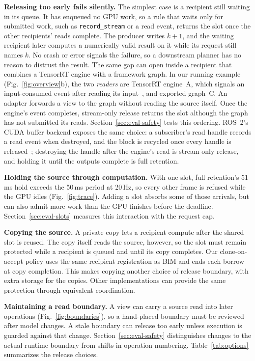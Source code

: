 \documentclass[conference]{IEEEtran}
\newcommand{\code}[1]{\texttt{#1}}
\newcommand{\ms}{\,ms}
\newcommand{\Hz}{\,Hz}
\begin{document}
\textbf{Releasing too early fails silently.} The simplest case is a recipient still waiting in its queue. It has enqueued no GPU work, so a rule that waits only for submitted work, such as \code{record\_stream} or a read event, returns the slot once the other recipients' reads complete. The producer writes $k{+}1$, and the waiting recipient later computes a numerically valid result on it while its request still names $k$. No crash or error signals the failure, so a downstream planner has no reason to distrust the result. The same gap can open inside a recipient that combines a TensorRT engine with a framework graph. In our running example (Fig.~\ref{fig:overview}b), the two \emph{readers} are TensorRT engine~A, which signals an input-consumed event after reading its input~\cite{tensorrt}, and exported graph~C. An adapter forwards a view to the graph without reading the source itself. Once the engine's event completes, stream-only release returns the slot although the graph has not submitted its reads. Section~\ref{sec:eval-safety} tests this ordering. ROS~2's CUDA buffer backend exposes the same choice: a subscriber's read handle records a read event when destroyed, and the block is recycled once every handle is released~\cite{cudabackend}; destroying the handle after the engine's read is stream-only release, and holding it until the outputs complete is full retention.

\textbf{Holding the source through computation.} With one slot, full retention's 51\ms{} hold exceeds the 50\ms{} period at 20\Hz, so every other frame is refused while the GPU idles (Fig.~\ref{fig:trace}). Adding a slot absorbs some of those arrivals, but can also admit more work than the GPU finishes before the deadline. Section~\ref{sec:eval-slots} measures this interaction with the request cap.

\textbf{Copying the source.} A private copy lets a recipient compute after the shared slot is reused. The copy itself reads the source, however, so the slot must remain protected while a recipient is queued and until its copy completes. Our clone-on-accept policy uses the same recipient registration as BIM and ends each borrow at copy completion. This makes copying another choice of release boundary, with extra storage for the copies. Other implementations can provide the same protection through equivalent coordination.

\textbf{Maintaining a read boundary.} A view can carry a source read into later operations (Fig.~\ref{fig:boundaries}), so a hand-placed boundary must be reviewed after model changes. A stale boundary can release too early unless execution is guarded against that change. Section~\ref{sec:eval-safety} distinguishes changes to the actual runtime boundary from shifts in operation numbering. Table~\ref{tab:options} summarizes the release choices.
\end{document}
